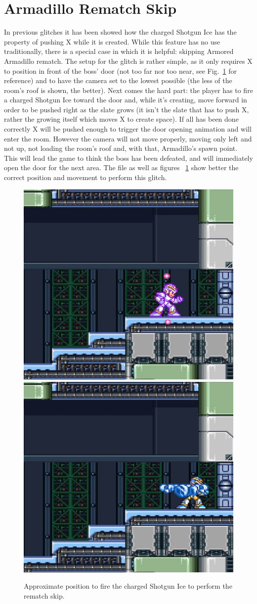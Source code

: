 \section{Armadillo Rematch Skip}\label{Armadillo_skip}
In previous glitches it has been showed how the charged Shotgun Ice has the property of pushing X while it is created. While this feature has no use traditionally, there is a special case in which it is helpful: skipping Armored Armadillo rematch. The setup for the glitch is rather simple, as it only requires X to position in front of the boss' door (not too far nor too near, see Fig.~\ref{Armadillo_skip_positioning} for reference) and to have the camera set to the lowest possible (the less of the room's roof is shown, the better). Next comes the hard part: the player has to fire a charged Shotgun Ice toward the door and, while it's creating, move forward in order to be pushed right as the slate grows (it isn't the slate that has to push X, rather the growing itself which moves X to create space). If all has been done correctly X will be pushed enough to trigger the door opening animation and will enter the room. However the camera will not move properly, moving only left and not up, not loading the room's roof and, with that, Armadillo's spawn point. This will lead the game to think the boss has been defeated, and will immediately open the door for the next area. The file  as well as figures ~\ref{Armadillo_skip_positioning} show better the correct position and movement to perform this glitch.
\begin{figure}[htp]
	\centering
	\includegraphics[width=0.45\linewidth]{figures/X1/Miscs/Dillo_skip_1.jpg}
	\includegraphics[width=0.45\linewidth]{figures/X1/Miscs/Dillo_skip_2.jpg}
	\caption{Approximate position to fire the charged Shotgun Ice to perform the rematch skip.}
	\label{Armadillo_skip_positioning}
\end{figure}
